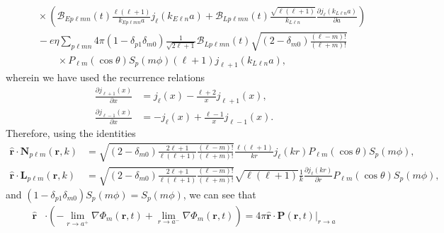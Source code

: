 \documentclass{article}
\begin{document}
\begin{equation}
\begin{split}
&\qquad\times\left(\mathcal{B}_{Ep\ell mn}(t)\frac{\ell(\ell + 1)}{k_{Ep\ell mn}a}j_\ell(k_{E\ell n}a) + \mathcal{B}_{Lp\ell mn}(t)\frac{\sqrt{\ell(\ell + 1)}}{k_{L\ell n}}\frac{\partial j_{\ell}(k_{L\ell n}a)}{\partial a}\right)\\
&\qquad - e\eta\sum_{p\ell mn}4\pi(1 - \delta_{p1}\delta_{m0})\frac{1}{\sqrt{2\ell + 1}}\mathcal{B}_{Lp\ell mn}(t)\sqrt{(2 - \delta_{m0})\frac{(\ell - m)!}{(\ell + m)!}}\\
&\qquad\qquad\times P_{\ell m}(\cos\theta)S_p(m\phi)(\ell + 1)j_{\ell + 1}(k_{L\ell n}a),
\end{split}
\end{equation}
wherein we have used the recurrence relations
\begin{equation}
\begin{split}
\frac{\partial j_{\ell + 1}(x)}{\partial x} &= j_\ell(x) - \frac{\ell + 2}{x}j_{\ell + 1}(x),\\
\frac{\partial j_{\ell - 1}(x)}{\partial x} &= -j_\ell(x) + \frac{\ell - 1}{x}j_{\ell - 1}(x).
\end{split}
\end{equation}
Therefore, using the identities
\begin{equation}
\begin{split}
\hat{\mathbf{r}}\cdot\mathbf{N}_{p\ell m}(\mathbf{r},k) &= \sqrt{(2 - \delta_{m0})\frac{2\ell + 1}{\ell(\ell + 1)}\frac{(\ell - m)!}{(\ell + m)!}}\frac{\ell(\ell + 1)}{kr}j_{\ell}(kr)P_{\ell m}(\cos\theta)S_p(m\phi),\\
\hat{\mathbf{r}}\cdot\mathbf{L}_{p\ell m}(\mathbf{r},k) &= \sqrt{(2 - \delta_{m0})\frac{2\ell + 1}{\ell(\ell + 1)}\frac{(\ell - m)!}{(\ell + m)!}}\sqrt{\ell(\ell + 1)}\frac{1}{k}\frac{\partial j_{\ell}(kr)}{\partial r}P_{\ell m}(\cos\theta)S_p(m\phi),
\end{split}
\end{equation}
and $(1 - \delta_{p1}\delta_{m0})S_p(m\phi) = S_p(m\phi)$, we can see that
\begin{equation}
\begin{split}
\hat{\mathbf{r}}&\cdot\left(-\lim_{r\to a^+}\nabla\Phi_m(\mathbf{r},t) + \lim_{r\to a^-}\nabla\Phi_m(\mathbf{r},t)\right)
= 4\pi\hat{\mathbf{r}}\cdot\left.\mathbf{P}(\mathbf{r},t)\right|_{r\to a}\\
\end{split}
\end{equation}
\end{document}
